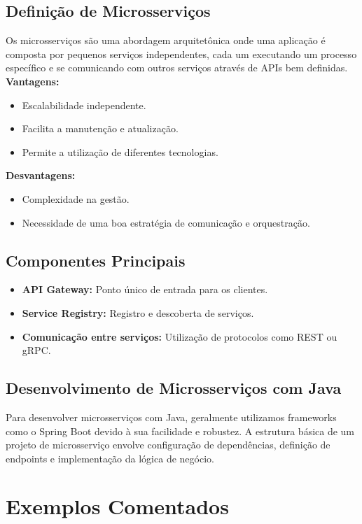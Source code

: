 \documentclass[a4paper,12pt]{book}
\begin{document}
\subsection{Definição de Microsserviços}
Os microsserviços são uma abordagem arquitetônica onde uma aplicação é composta por pequenos serviços independentes, cada um executando um processo específico e se comunicando com outros serviços através de APIs bem definidas. \\
\textbf{Vantagens:}
\begin{itemize}
  \item Escalabilidade independente.
  \item Facilita a manutenção e atualização.
  \item Permite a utilização de diferentes tecnologias.
\end{itemize}
\textbf{Desvantagens:}
\begin{itemize}
  \item Complexidade na gestão.
  \item Necessidade de uma boa estratégia de comunicação e orquestração.
\end{itemize}

\subsection{Componentes Principais}
\begin{itemize}
  \item \textbf{API Gateway:} Ponto único de entrada para os clientes.
  \item \textbf{Service Registry:} Registro e descoberta de serviços.
  \item \textbf{Comunicação entre serviços:} Utilização de protocolos como REST ou gRPC.
\end{itemize}

\subsection{Desenvolvimento de Microsserviços com Java}
Para desenvolver microsserviços com Java, geralmente utilizamos frameworks como o Spring Boot devido à sua facilidade e robustez. A estrutura básica de um projeto de microsserviço envolve configuração de dependências, definição de endpoints e implementação da lógica de negócio.

\section{Exemplos Comentados}
\end{document}
